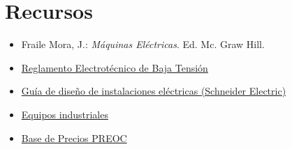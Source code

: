 \documentclass[xcolor={usenames,svgnames,dvipsnames}]{beamer}
\begin{document}
\section{Recursos}
\label{sec:org5bd192d}

\begin{itemize}
\item \alert{Fraile Mora, J.}: \emph{Máquinas Eléctricas}. Ed. Mc. Graw Hill.

\item \href{http://www.f2i2.net/legislacionseguridadindustrial/Si\_ambito.aspx?id\_am=76}{Reglamento Electrotécnico de Baja Tensión}

\item \href{https://www.schneider-electric.es/es/download/document/020511E10/}{Guía de diseño de instalaciones eléctricas (Schneider Electric)}

\item \href{http://www.directindustry.com/}{Equipos industriales}

\item \href{http://www.preoc.es/}{Base de Precios PREOC}
\end{itemize}
\end{document}

